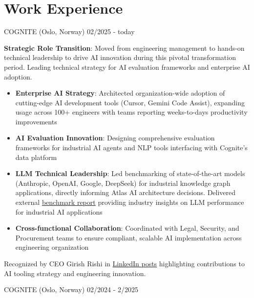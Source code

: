 \documentclass[singlesided,
               paper=a4,
               fontsize=10pt
              ]{my-resume}
\begin{document}
\section[\faBriefcase]{Work Experience}
	{COGNITE (Oslo, Norway)}
    {02/2025 - today}
    {
        \textbf{Strategic Role Transition}: Moved from engineering management to hands-on technical leadership to drive AI innovation during this pivotal transformation period. Leading technical strategy for AI evaluation frameworks and enterprise AI adoption.

        \begin{itemize}[leftmargin=2em]
            \item \textbf{Enterprise AI Strategy}: Architected organization-wide adoption of cutting-edge AI development tools (Cursor, Gemini Code Assist), expanding usage across 100+ engineers with teams reporting weeks-to-days productivity improvements
            \item \textbf{AI Evaluation Innovation}: Designing comprehensive evaluation frameworks for industrial AI agents and NLP tools interfacing with Cognite's data platform
            \item \textbf{LLM Technical Leadership}: Led benchmarking of state-of-the-art models (Anthropic, OpenAI, Google, DeepSeek) for industrial knowledge graph applications, directly informing Atlas AI architecture decisions. Delivered external \href{https://www.cognite.com/en/resources/white-papers/atlas-ai-slm-llm-benchmark-report}{benchmark report} providing industry insights on LLM performance for industrial AI applications
            \item \textbf{Cross-functional Collaboration}: Coordinated with Legal, Security, and Procurement teams to ensure compliant, scalable AI implementation across engineering organization
        \end{itemize}

        Recognized by CEO Girish Rishi in \href{https://www.linkedin.com/posts/girish-rishi-4392587_peet-cremer-our-engineering-leader-showing-activity-7343289548442955776-Zu2p?utm_source=share&utm_medium=member_desktop&rcm=ACoAADAmkPABVhPkjuk0vvCtiRSid_p7fC4zU_o}{LinkedIn posts} highlighting contributions to AI tooling strategy and engineering innovation.
    }
%    
	{COGNITE (Oslo, Norway)}
    {02/2024 - 2/2025}
\end{document}
